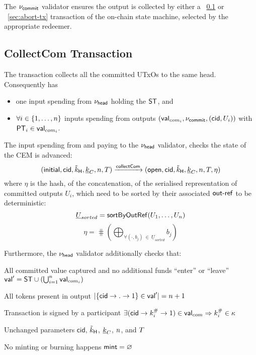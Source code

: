 \noindent The $\nu_\mathsf{commit}$ validator ensures the output is collected by either a \mtxCCom{}~\ref{sec:collect-tx} or \mtxAbort{}~\ref{sec:abort-tx} transaction of the on-chain state machine, selected by the appropriate redeemer.

\subsection{CollectCom Transaction}\label{sec:collect-tx}



The \mtxCCom{} transaction collects all the committed UTxOs to the same head.
Consequently \mtxCCom{} has
\begin{itemize}
  \item one input spending from $\nu_\mathsf{head}$ holding the $\mathsf{ST}$, and
  \item $\forall i \in \{1, \ldots, n\}$ inputs spending from \mtxCom{} outputs $(\mathsf{val}_{com_i}, \nu_\mathsf{commit}, (\mathsf{cid}, U_{i}))$ with $\mathsf{PT}_{i} \in \mathsf{val}_{com_{i}}$.
\end{itemize}
The input spending from and paying to the $\nu_\mathsf{head}$ validator, checks the state
of the CEM is advanced:
\[
   (\mathsf{initial},\mathsf{cid},\tilde{k}_{\mathsf{H}},\underline{k}_C,n,T) \xrightarrow{\mathsf{collectCom}} (\mathsf{open},\mathsf{cid},\tilde{k}_{\mathsf{H}},\underline{k}_C,n,T,\eta)
\]
where $\eta$ is the hash, of the concatenation, of the serialised representation
of committed outputs $U_{i}$, which need to be sorted by their associated
$\mathsf{out\textsf{-}{}ref}$ to be deterministic: 
\[
  \underline{U}_{sorted} = \mathsf{sortByOutRef} ( U_{1}, \dots, U_{n} )
\]
\[
  \eta = \hash(\bigoplus_{\forall (\cdot, b_{j})~\in~\underline{U}_{sorted}} b_{j})
\]

\noindent Furthermore, the $\nu_\mathsf{head}$ validator additionally checks that:
\begin{menumerate}
  \item All committed value captured and no additional funds ``enter'' or ``leave''\\
  $\mathsf{val}' = \mathsf{ST} \cup (\bigcup_{i=1}^{n} \mathsf{val}_{com_i})$
  \item All tokens present in output
  $|\{\mathsf{cid} \rightarrow . \rightarrow 1\} \in \mathsf{val}'| = n + 1$
  \item Transaction is signed by a participant $\exists (\mathsf{cid} \rightarrow k^{\#}_{i} \rightarrow 1) \in \mathsf{val}_{com} \Rightarrow k^{\#}_{i} \in \kappa$
  \item Unchanged parameters $\mathsf{cid}$, $\tilde{k}_{\mathsf{H}}$, $\underline{k}_C$, $n$, and
  $T$ 
  \item No minting or burning happens $\mathsf{mint} = \varnothing$
\end{menumerate}

